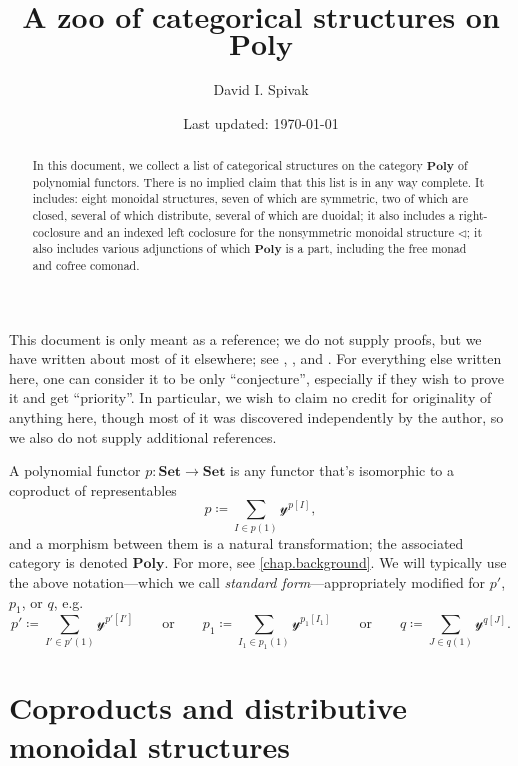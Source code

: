 \documentclass[11pt, one side, article]{memoir}
\theoremstyle{definition}
\theoremstyle{plain}
\newcommand{\Cat}[1]{\mathbf{#1}}%
\newcommand{\smset}{\Cat{Set}}
\newcommand{\yon}{\mathcal{y}}
\newcommand{\poly}{\Cat{Poly}}
\newcommand{\0}{\textsf{0}}
\newcommand{\1}{\tn{\textsf{1}}}
\newcommand{\tri}{\mathbin{\triangleleft}}
\newcommand{\qqor}{\qquad\text{or}\qquad}
\begin{document}
\title{A zoo of categorical structures on $\poly$}

\author{David I. Spivak}

\date{Last updated: \today}

\maketitle

\begin{abstract}
In this document, we collect a list of categorical structures on the category $\poly$ of polynomial functors. There is no implied claim that this list is in any way complete. It includes: eight monoidal structures, seven of which are symmetric, two of which are closed, several of which distribute, several of which are duoidal; it also includes a right-coclosure and an indexed left coclosure for the nonsymmetric monoidal structure $\tri$; it also includes various adjunctions of which $\poly$ is a part, including the free monad and cofree comonad. 
\end{abstract}

This document is only meant as a reference; we do not supply proofs, but we have written about most of it elsewhere; see \cite{spivak2022poly}, \cite{spivak2021functorial}, and \cite{spivak2022polynomial}. 
 For everything else written here, one can consider it to be only ``conjecture'', especially if they wish to prove it and get ``priority''. In particular, we wish to claim no credit for originality of anything here, though most of it was discovered independently by the author, so we also do not supply additional references. 

\bigskip

A polynomial functor $p\colon\smset\to\smset$ is any functor that's isomorphic to a coproduct of representables
\[
p\coloneqq\sum_{I\in p(1)}\yon^{p[I]},
\]
and a morphism between them is a natural transformation; the associated category is denoted $\poly$. For more, see \cref{chap.background}. We will typically use the above notation---which we call \emph{standard form}---appropriately modified for $p'$, $p_1$, or $q$, e.g.
\[
p'\coloneqq\sum_{I'\in p'(1)}\yon^{p'[I']}
\qqor
p_1\coloneqq\sum_{I_1\in p_1(1)}\yon^{p_1[I_1]}
\qqor
q\coloneqq\sum_{J\in q(1)}\yon^{q[J]}.
\]


\chapter{Coproducts and distributive monoidal structures}
\end{document}

